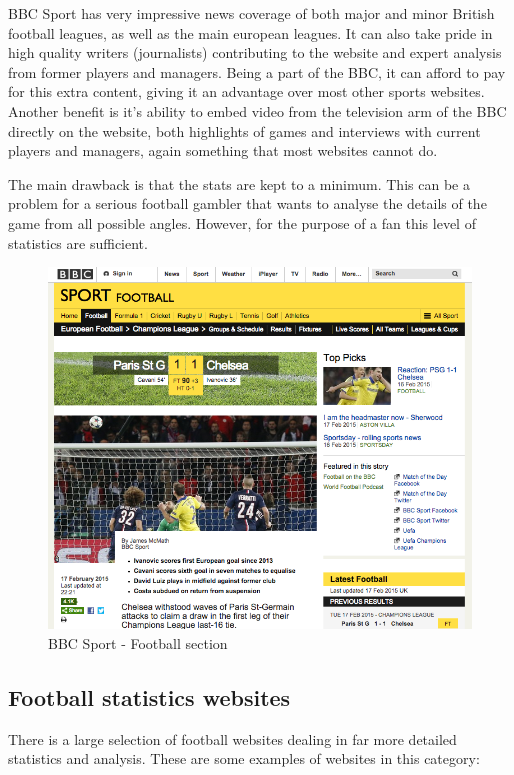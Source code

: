 BBC Sport has very impressive news coverage of both major and minor British football leagues, as well as the main european leagues. It can also take pride in high quality writers (journalists) contributing to the website and expert analysis from former players and managers. Being a part of the BBC, it can afford to pay for this extra content, giving it an advantage over most other sports websites. Another benefit is it’s ability to embed video from the television arm of the BBC directly on the website, both highlights of games and interviews with current players and managers, again something that most websites cannot do. 

The main drawback is that the stats are kept to a minimum. This can be a problem for a serious football gambler that wants to analyse the details of the game from all possible angles. However, for the purpose of a fan this level of statistics are sufficient.
	
\begin{figure}[H]
	\begin{center}
		\includegraphics[width=.80\linewidth,natwidth=610,natheight=642]{req/images/bbcsport.png}
		\caption{BBC Sport - Football section} \label{fig:using:bbcsport}
	\end{center}
\end{figure}
		
\subsection{Football statistics websites}
\label{subsec:footballstatswebsites_req}
There is a large selection of football websites dealing in far more detailed statistics and analysis. These are some examples of websites in this category:
			
